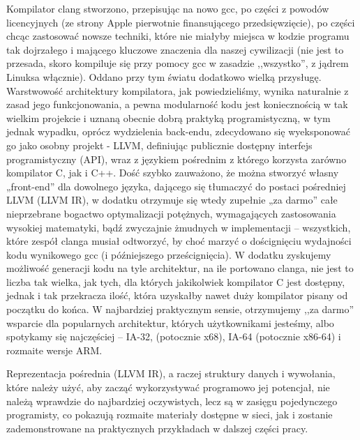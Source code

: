 Kompilator clang stworzono, przepisując na nowo gcc, po części z powodów licencyjnych (ze strony Apple pierwotnie finansującego przedsięwzięcie), po części chcąc zastosować nowsze techniki, które nie miałyby miejsca w kodzie programu tak dojrzałego i mającego kluczowe znaczenia dla naszej cywilizacji (nie jest to przesada, skoro kompiluje się przy pomocy gcc w zasadzie ,,wszystko'', z jądrem Linuksa włącznie). Oddano przy tym światu dodatkowo wielką przysługę. Warstwowość architektury kompilatora, jak powiedzieliśmy, wynika naturalnie z zasad jego funkcjonowania, a pewna modularność kodu jest koniecznością w tak wielkim projekcie i uznaną obecnie dobrą praktyką programistyczną, w tym jednak wypadku, oprócz wydzielenia back-endu, zdecydowano się wyeksponować go jako osobny projekt - LLVM, definiując publicznie dostępny interfejs programistyczny (API), wraz z językiem pośrednim z którego korzysta zarówno kompilator C, jak i C++. Dość szybko zauważono, że można stworzyć własny „front-end” dla dowolnego języka, dającego się tłumaczyć do postaci pośredniej LLVM (LLVM IR), w dodatku otrzymuje się wtedy zupełnie „za darmo” całe nieprzebrane bogactwo optymalizacji potężnych, wymagających zastosowania wysokiej matematyki, bądź zwyczajnie żmudnych w implementacji – wszystkich, które zespół clanga musiał odtworzyć, by choć marzyć o doścignięciu wydajności kodu wynikowego gcc (i późniejszego prześcignięcia). W dodatku zyskujemy możliwość generacji kodu na tyle architektur, na ile portowano clanga, nie jest to liczba tak wielka, jak tych, dla których jakikolwiek kompilator C jest dostępny, jednak i tak przekracza ilość, która uzyskałby nawet duży kompilator pisany od początku do końca. W najbardziej praktycznym sensie, otrzymujemy ,,za darmo'' wsparcie dla popularnych architektur, których użytkownikami jesteśmy, albo spotykamy się najczęściej – IA-32, (potocznie x68), IA-64 (potocznie x86-64) i rozmaite wersje ARM.\cite{llvm_org, forum_llvm_apple_licenses}

Reprezentacja pośrednia (LLVM IR), a raczej struktury danych i wywołania, które należy użyć, aby zacząć wykorzystywać programowo jej potencjał, nie należą wprawdzie do najbardziej oczywistych, lecz są w zasięgu pojedynczego programisty, co pokazują rozmaite materiały dostępne w sieci\cite{kalleidoscope}, jak i zostanie zademonstrowane na praktycznych przykładach w dalszej części pracy.

